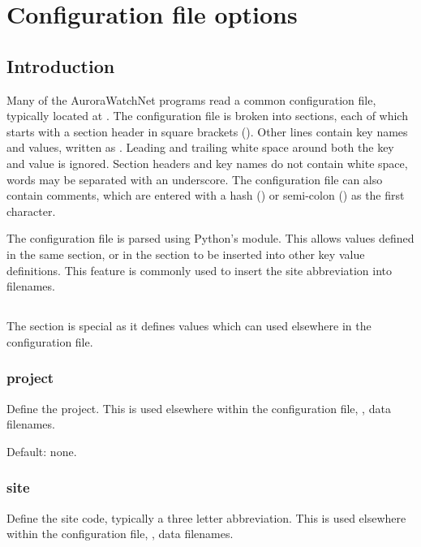 \chapter{Configuration file options}

\newcommand{\configexample}[2][]{\examplebox[#1]{#2}}

\section{Introduction}
Many of the AuroraWatchNet programs read a common configuration file,
typically located at . The configuration file
is broken into sections, each of which starts with a section header in
square brackets (). Other lines contain key names
and values, written as . Leading and trailing
white space around both the key and value is ignored. Section headers
and key names do not contain white space, words may be separated with an
underscore. The configuration file can also contain comments, which
are entered with a hash (\code{\#}) or semi-colon (\code{;}) as the
first character.

The configuration file is parsed using Python's 
module. This allows values defined in the same section, or in the
\code{[DEFAULT]} section to be inserted into other key value
definitions. This feature is commonly used to insert the site
abbreviation into filenames.

\section{\code{[DEFAULT]}}

The \code{[DEFAULT]} section is special as it defines values which can
used elsewhere in the configuration file.

\subsection{project}
Define the project. This is
used elsewhere within the configuration file, \eg, data filenames.

Default: none.

\subsection{site}
Define the site code, typically a three letter abbreviation. This is
used elsewhere within the configuration file, \eg, data filenames.

